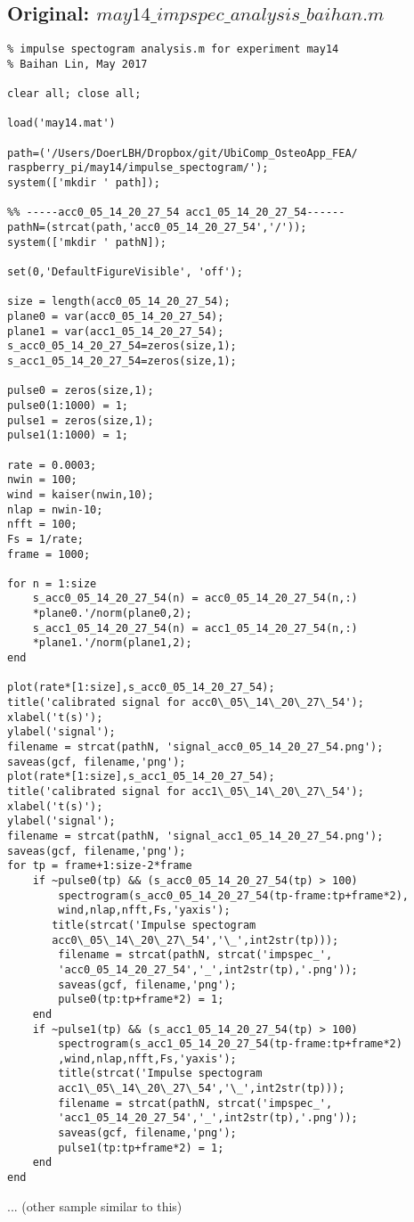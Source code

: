 \documentclass{sigchi}
\begin{document}
\subsection{Original: $may14\_impspec\_analysis\_baihan.m$}\label{ss:impspc_ana.m}
\begin{lstlisting}
% impulse spectogram analysis.m for experiment may14 
% Baihan Lin, May 2017

clear all; close all;

load('may14.mat')

path=('/Users/DoerLBH/Dropbox/git/UbiComp_OsteoApp_FEA/
raspberry_pi/may14/impulse_spectogram/');
system(['mkdir ' path]);

%% -----acc0_05_14_20_27_54 acc1_05_14_20_27_54------
pathN=(strcat(path,'acc0_05_14_20_27_54','/'));
system(['mkdir ' pathN]);

set(0,'DefaultFigureVisible', 'off');

size = length(acc0_05_14_20_27_54);
plane0 = var(acc0_05_14_20_27_54);
plane1 = var(acc1_05_14_20_27_54);
s_acc0_05_14_20_27_54=zeros(size,1);
s_acc1_05_14_20_27_54=zeros(size,1);

pulse0 = zeros(size,1);
pulse0(1:1000) = 1;
pulse1 = zeros(size,1);
pulse1(1:1000) = 1;

rate = 0.0003;
nwin = 100;
wind = kaiser(nwin,10);
nlap = nwin-10;
nfft = 100;
Fs = 1/rate;
frame = 1000;

for n = 1:size
    s_acc0_05_14_20_27_54(n) = acc0_05_14_20_27_54(n,:)
    *plane0.'/norm(plane0,2);
    s_acc1_05_14_20_27_54(n) = acc1_05_14_20_27_54(n,:)
    *plane1.'/norm(plane1,2);
end

plot(rate*[1:size],s_acc0_05_14_20_27_54);
title('calibrated signal for acc0\_05\_14\_20\_27\_54');
xlabel('t(s)');
ylabel('signal');
filename = strcat(pathN, 'signal_acc0_05_14_20_27_54.png');
saveas(gcf, filename,'png');
plot(rate*[1:size],s_acc1_05_14_20_27_54);
title('calibrated signal for acc1\_05\_14\_20\_27\_54');
xlabel('t(s)');
ylabel('signal');
filename = strcat(pathN, 'signal_acc1_05_14_20_27_54.png');
saveas(gcf, filename,'png');
for tp = frame+1:size-2*frame
    if ~pulse0(tp) && (s_acc0_05_14_20_27_54(tp) > 100)
        spectrogram(s_acc0_05_14_20_27_54(tp-frame:tp+frame*2),
        wind,nlap,nfft,Fs,'yaxis');
       title(strcat('Impulse spectogram 
       acc0\_05\_14\_20\_27\_54','\_',int2str(tp)));
        filename = strcat(pathN, strcat('impspec_',
        'acc0_05_14_20_27_54','_',int2str(tp),'.png'));
        saveas(gcf, filename,'png');
        pulse0(tp:tp+frame*2) = 1;
    end
    if ~pulse1(tp) && (s_acc1_05_14_20_27_54(tp) > 100)
        spectrogram(s_acc1_05_14_20_27_54(tp-frame:tp+frame*2)
        ,wind,nlap,nfft,Fs,'yaxis');
        title(strcat('Impulse spectogram 
        acc1\_05\_14\_20\_27\_54','\_',int2str(tp)));
        filename = strcat(pathN, strcat('impspec_',
        'acc1_05_14_20_27_54','_',int2str(tp),'.png'));
        saveas(gcf, filename,'png');
        pulse1(tp:tp+frame*2) = 1;
    end
end
\end{lstlisting}
... (other sample similar to this)
\end{document}
